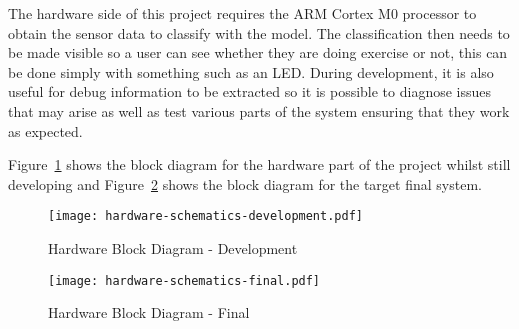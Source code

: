 
The hardware side of this project requires the ARM Cortex M0 processor to obtain the sensor data to classify with the model. The classification then needs to be made visible so a user can see whether they are doing exercise or not, this can be done simply with something such as an LED. During development, it is also useful for debug information to be extracted so it is possible to diagnose issues that may arise as well as test various parts of the system ensuring that they work as expected. 

Figure~\ref{fig:hardware_schematic_development} shows the block diagram for the hardware part of the project whilst still developing and Figure~\ref{fig:hardware_schematic_final} shows the block diagram for the target final system.

\begin{figure}[!hb]
	\centering
	\texttt{[image: hardware-schematics-development.pdf]}
	\caption{Hardware Block Diagram - Development}
	\label{fig:hardware_schematic_development}
\end{figure}

\begin{figure}
	\centering
	\texttt{[image: hardware-schematics-final.pdf]}
	\caption{Hardware Block Diagram - Final}
	\label{fig:hardware_schematic_final}
\end{figure}
